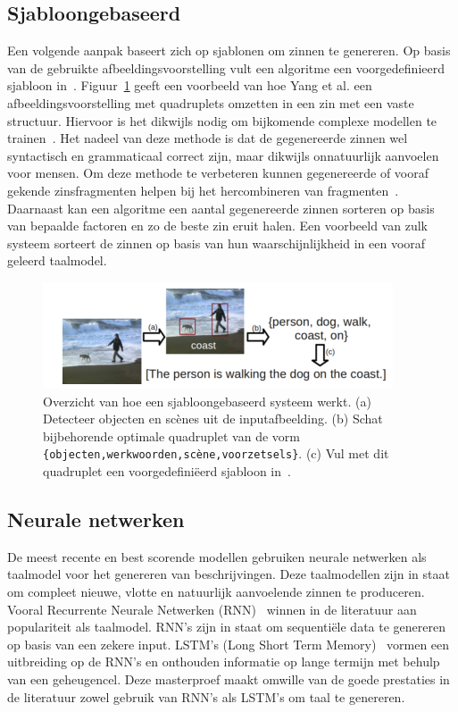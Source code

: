 \subsection{Sjabloongebaseerd}
Een volgende aanpak baseert zich op sjablonen om zinnen te genereren. Op basis van de gebruikte afbeeldingsvoorstelling vult een algoritme een voorgedefinieerd sjabloon in~\cite{Yang2011}. Figuur~\ref{fig:sjabloon} geeft een voorbeeld van hoe Yang et al. een afbeeldingsvoorstelling met quadruplets omzetten in een zin met een vaste structuur. Hiervoor is het dikwijls nodig om bijkomende complexe modellen te trainen~\cite{Elliott2013}. Het nadeel van deze methode is dat de gegenereerde zinnen wel syntactisch en grammaticaal correct zijn, maar dikwijls onnatuurlijk aanvoelen voor mensen. Om deze methode te verbeteren kunnen gegenereerde of vooraf gekende zinsfragmenten helpen bij het hercombineren van fragmenten~\cite{Kuznetsova2012,Mitchell2012}. Daarnaast kan een algoritme een aantal gegenereerde zinnen sorteren op basis van bepaalde factoren en zo de beste zin eruit halen. Een voorbeeld van zulk systeem sorteert de zinnen op basis van hun waarschijnlijkheid in een vooraf geleerd taalmodel.

 \begin{figure}[tb]
 	\centering
 	\includegraphics[width=\textwidth]{Images/sjabloon.PNG}
 	\caption[Overzicht van hoe een sjabloongebaseerd systeem werkt]{Overzicht van hoe een sjabloongebaseerd systeem werkt. (a) Detecteer objecten en sc\`enes uit de inputafbeelding. (b) Schat bijbehorende optimale quadruplet van de vorm \texttt{\{objecten,werkwoorden,sc\`ene,voorzetsels\}}. (c) Vul met dit quadruplet een voorgedefini\"eerd sjabloon in~\cite{Yang2011}.}
 	\label{fig:sjabloon}
 \end{figure}

\subsection{Neurale netwerken}
De meest recente en best scorende modellen gebruiken neurale netwerken als taalmodel voor het genereren van beschrijvingen. Deze taalmodellen zijn in staat om compleet nieuwe, vlotte en natuurlijk aanvoelende zinnen te produceren. Vooral Recurrente Neurale Netwerken (RNN)~\cite{Mikolov2010} winnen in de literatuur aan populariteit als taalmodel. RNN's zijn in staat om sequenti\"ele data te genereren op basis van een zekere input. LSTM's (Long Short Term Memory)~\cite{SeppHochreiter1997} vormen een uitbreiding op de RNN's en onthouden informatie op lange termijn met behulp van een geheugencel. Deze masterproef maakt omwille van de goede prestaties in de literatuur zowel gebruik van RNN's als LSTM's om taal te genereren.


